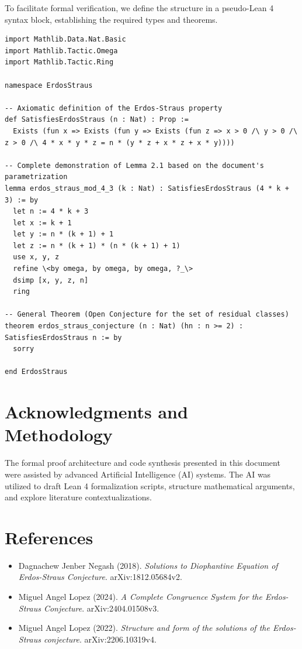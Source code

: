 \documentclass[12pt,a4paper]{article}
\begin{document}
To facilitate formal verification, we define the structure in a pseudo-Lean 4 syntax block, establishing the required types and theorems.

\begin{verbatim}
import Mathlib.Data.Nat.Basic
import Mathlib.Tactic.Omega
import Mathlib.Tactic.Ring

namespace ErdosStraus

-- Axiomatic definition of the Erdos-Straus property
def SatisfiesErdosStraus (n : Nat) : Prop :=
  Exists (fun x => Exists (fun y => Exists (fun z => x > 0 /\ y > 0 /\ z > 0 /\ 4 * x * y * z = n * (y * z + x * z + x * y))))

-- Complete demonstration of Lemma 2.1 based on the document's parametrization
lemma erdos_straus_mod_4_3 (k : Nat) : SatisfiesErdosStraus (4 * k + 3) := by
  let n := 4 * k + 3
  let x := k + 1
  let y := n * (k + 1) + 1
  let z := n * (k + 1) * (n * (k + 1) + 1)
  use x, y, z
  refine \<by omega, by omega, by omega, ?_\>
  dsimp [x, y, z, n]
  ring

-- General Theorem (Open Conjecture for the set of residual classes)
theorem erdos_straus_conjecture (n : Nat) (hn : n >= 2) : SatisfiesErdosStraus n := by
  sorry

end ErdosStraus
\end{verbatim}


\section*{Acknowledgments and Methodology}
The formal proof architecture and code synthesis presented in this document were assisted by advanced Artificial Intelligence (AI) systems. The AI was utilized to draft Lean 4 formalization scripts, structure mathematical arguments, and explore literature contextualizations.

\section*{References}
\begin{itemize}
    \item Dagnachew Jenber Negash (2018). \textit{Solutions to Diophantine Equation of Erdos-Straus Conjecture}. arXiv:1812.05684v2.
    \item Miguel Angel Lopez (2024). \textit{A Complete Congruence System for the Erdos-Straus Conjecture}. arXiv:2404.01508v3.
    \item Miguel Angel Lopez (2022). \textit{Structure and form of the solutions of the Erdos-Straus conjecture}. arXiv:2206.10319v4.
\end{itemize}

\
\end{document}
